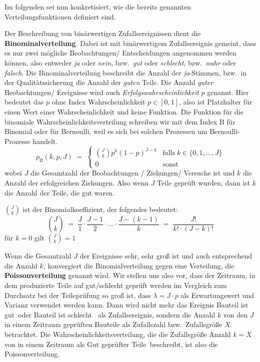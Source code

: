Im folgenden sei nun konkretisiert, wie die bereits genannten Verteilungsfunktionen definiert sind.

Der Beschreibung von binärwertigen Zufallsereignissen dient die \textbf{Binominalverteilung}.
Dabei ist mit binärwertigem Zufallsereignis gemeint, dass es nur zwei mögliche
Beobachtungen/ Entscheidungen angenommen werden können, also entweder \textsl{ja} oder \textsl{nein},
bzw.\ \textsl{gut} oder \textsl{schlecht},
bzw.\ \textsl{wahr} oder \textsl{falsch}. Die Binominalverteilung beschreibt die Anzahl der
\textsl{ja}-Stimmen, bzw.\ in der Qualitätssicherung die Anzahl der \textsl{guten} Teile.
Die Anzahl \textsl{guter} Beobachtungen/ Ereignisse wird auch \textsl{Erfolgswahrscheinlichkeit}
$p$ genannt. Hier bedeutet das $p$ ohne Index Wahrscheinlichkeit $p \in [0,1]$,
also ist Platzhalter für einen Wert einer Wahrscheinlichkeit und keine Funktion.
Die Funktion für die binomiale Wahrscheinlichkeitsverteilung schreiben wir mit dem Index $\mathrm{B}$ für
Binomial oder für Bernoulli, weil es sich bei solchen Prozessen um Bernoulli-Prozesse handelt.
\begin{equation}
p_\mathrm{B}(k, p, J) \; = \;
\left\{ \begin{array}{ll}
\binom{J}{k} p^k \left(1 - p\right)^{J - k} & \text{falls} \; k \in \{0, 1, \dots, J\}\\
0 & \text{sonst}
\end{array}\right.
\end{equation}
wobei $J$ die Gesamtzahl der Beobachtungen / Ziehungen/ Versuche ist und $k$ die Anzahl der
erfolgreichen Ziehungen. Also wenn $J$ Teile geprüft wurden, dann ist $k$ die Anzahl der Teile,
die gut waren.

$\binom{J}{k}$ ist der Binomialkoeffizient, der folgendes bedeutet:
$$
\binom{J}{k} \; = \; \frac{J}{1} \cdot \frac{J-1}{2} \cdot
  \dots \cdot \frac{J- (k-1)}{k} \; = \;
  \frac{J!}{k! \cdot (J - k)!}
$$
für $k = 0$ gilt $\binom{J}{k} = 1$


Wenn die Gesamtzahl $J$ der Ereignisse sehr, sehr groß ist und auch entsprechend die Anzahl $k$,
konvergiert die Binomialverteilung gegen eine Verteilung, die \textbf{Poissonverteilung} genannt wird.
Wir stellen uns also vor, dass der Zeitraum, in dem produzierte Teile auf gut/schlecht geprüft werden im
Vergleich zum Durchsatz bei der Teileprüfung so groß ist, dass $\lambda = J \cdot p$ als Erwartungswert und Varianz
verwendet werden kann. Dann wird nicht mehr das Ereignis \glqq Bauteil ist gut\grqq ~oder \glqq Bauteil ist schlecht\grqq
~als Zufallsereignis, sondern die Anzahl $k$ von den $J$ in einem Zeitraum geprüften Bauteile als
Zufallszahl bzw.\ Zufallsgröße $X$ betrachtet. Die Wahrscheinlichkeitsverteilung, die die Zufallsgröße
\glqq Anzahl $k = X$ von in einem Zeitraum als Gut geprüfter Teile\grqq ~beschreibt, ist also die Poissonverteilung.

